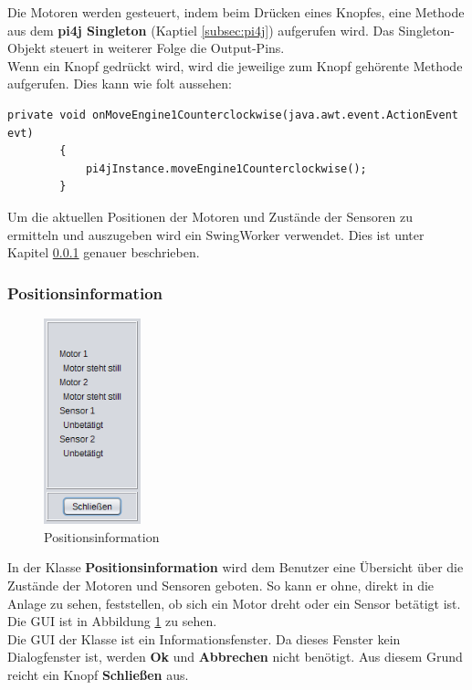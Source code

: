 Die Motoren werden gesteuert, indem beim Drücken eines Knopfes, eine Methode aus dem \textbf{pi4j Singleton} (Kaptiel \ref{subsec:pi4j}) aufgerufen wird. Das Singleton-Objekt steuert in weiterer Folge die Output-Pins.
\\ Wenn ein Knopf gedrückt wird, wird die jeweilige zum Knopf gehörente Methode aufgerufen. Dies kann wie folt aussehen:
\begin{lstlisting}[style=JavaStyle, caption=Motoren drehen] 
	private void onMoveEngine1Counterclockwise(java.awt.event.ActionEvent evt)                                               
    	{                                                   
        	pi4jInstance.moveEngine1Counterclockwise();
    	}  
\end{lstlisting}

\vspace{10pt}

Um die aktuellen Positionen der Motoren und Zustände der Sensoren zu ermitteln und auszugeben wird ein SwingWorker verwendet. Dies ist unter Kapitel \ref{subsubsec:Positionsinformation} genauer beschrieben.

\newpage

\subsubsection{Positionsinformation} \label{subsubsec:Positionsinformation}
\begin{figure}
\vspace{-20pt}
  \begin{center}
    \includegraphics[width=0.25\textwidth]{Bilder/GUI/Positionsinformation}
  \end{center}
  \caption{Positionsinformation}
  \label{Positionsinformation}
  \vspace{-10pt}
\end{figure}
In der Klasse \textbf{Positionsinformation} wird dem Benutzer eine Übersicht über die Zustände der Motoren und Sensoren geboten. So kann er ohne, direkt in die Anlage zu sehen, feststellen, ob sich ein Motor dreht oder ein Sensor betätigt ist.
\\ Die GUI ist in Abbildung \ref{Positionsinformation} zu sehen.
\\ Die GUI der Klasse ist ein Informationsfenster. Da dieses Fenster kein Dialogfenster ist, werden \textbf{Ok} und \textbf{Abbrechen} nicht benötigt. Aus diesem Grund reicht ein Knopf \textbf{Schließen} aus.


